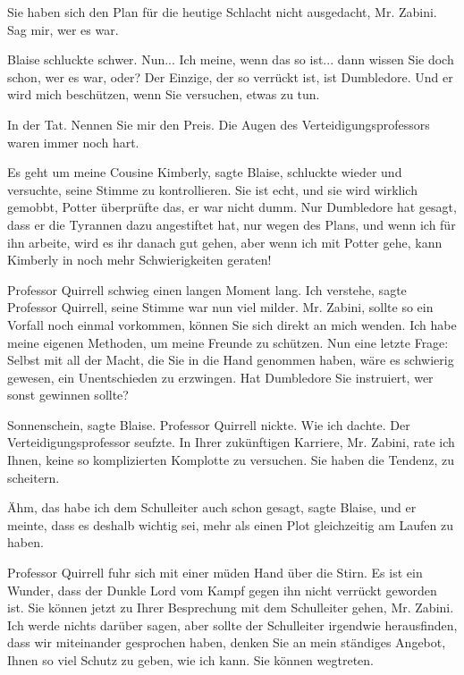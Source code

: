 \glqq{}Sie haben sich den Plan für die heutige Schlacht nicht ausgedacht, Mr.
Zabini. Sag mir, wer es war.\grqq{}

Blaise schluckte schwer. \glqq{}Nun... Ich meine, wenn das so ist... dann wissen
Sie doch schon, wer es war, oder? Der Einzige, der so verrückt ist, ist
Dumbledore. Und er wird mich beschützen, wenn Sie versuchen, etwas zu tun.\grqq{}

\glqq{}In der Tat. Nennen Sie mir den Preis.\grqq{} Die Augen des
Verteidigungsprofessors waren immer noch hart.

\glqq{}Es geht um meine Cousine Kimberly\grqq{}, sagte Blaise, schluckte wieder
und versuchte, seine Stimme zu kontrollieren. \glqq{}Sie ist echt, und sie wird
wirklich gemobbt\grqq{}, Potter überprüfte das, er war nicht dumm. Nur
Dumbledore hat gesagt, dass er die Tyrannen dazu angestiftet hat, nur wegen des
Plans, und wenn ich für ihn arbeite, wird es ihr danach gut gehen, aber wenn ich
mit Potter gehe, kann Kimberly in noch mehr Schwierigkeiten geraten!\grqq{}

Professor Quirrell schwieg einen langen Moment lang. \glqq{}Ich verstehe\grqq{},
sagte Professor Quirrell, seine Stimme war nun viel milder. \glqq{}Mr. Zabini,
sollte so ein Vorfall noch einmal vorkommen, können Sie sich direkt an mich
wenden. Ich habe meine eigenen Methoden, um meine Freunde zu schützen. Nun eine
letzte Frage: Selbst mit all der Macht, die Sie in die Hand genommen haben, wäre
es schwierig gewesen, ein Unentschieden zu erzwingen. Hat Dumbledore Sie
instruiert, wer sonst gewinnen sollte?\grqq{}

\glqq{}Sonnenschein\grqq{}, sagte Blaise. Professor Quirrell nickte. \glqq{}Wie
ich dachte.\grqq{} Der Verteidigungsprofessor seufzte. \glqq{}In Ihrer zukünftigen
Karriere, Mr. Zabini, rate ich Ihnen, keine so komplizierten Komplotte zu
versuchen. Sie haben die Tendenz, zu scheitern.\grqq{}

\glqq{}Ähm, das habe ich dem Schulleiter auch schon gesagt\grqq{}, sagte Blaise,
\glqq{}und er meinte, dass es deshalb wichtig sei, mehr als einen Plot
gleichzeitig am Laufen zu haben.\grqq{}

Professor Quirrell fuhr sich mit einer müden Hand über die Stirn. \glqq{}Es ist
ein Wunder, dass der Dunkle Lord vom Kampf gegen ihn nicht verrückt geworden
ist. Sie können jetzt zu Ihrer Besprechung mit dem Schulleiter gehen, Mr.
Zabini. Ich werde nichts darüber sagen, aber sollte der Schulleiter irgendwie
herausfinden, dass wir miteinander gesprochen haben, denken Sie an mein
ständiges Angebot, Ihnen so viel Schutz zu geben, wie ich kann. Sie können
wegtreten.\grqq{}

